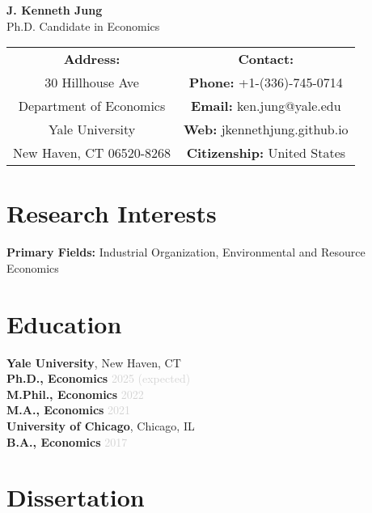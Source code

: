 \documentclass[11pt,letterpaper]{article}
\newcommand{\jobtitle}[1]{\textbf{\color{mediumgray}#1}}
\newcommand{\daterange}[1]{\textcolor{lightgray}{#1}}
\newenvironment{cvheader}
{\begin{center}\Large}
{\end{center}}
\begin{document}
\begin{cvheader}
{\Huge\textbf{\color{darkblue}J. Kenneth Jung}}\\[8pt]
{\large\textcolor{mediumgray}{Ph.D. Candidate in Economics}}
\end{cvheader}

\vspace{12pt}

\begin{center}
\begin{tabular}{c c}
\textbf{Address:} & \textbf{Contact:} \\
30 Hillhouse Ave & \textbf{Phone:} +1-(336)-745-0714 \\
Department of Economics & \textbf{Email:} ken.jung@yale.edu \\
Yale University & \textbf{Web:} jkennethjung.github.io \\
New Haven, CT 06520-8268 & \textbf{Citizenship:} United States \\
\end{tabular}
\end{center}

\vspace{8pt}

\section*{Research Interests}
\textbf{Primary Fields:} Industrial Organization, Environmental and Resource Economics

\section*{Education}

\textbf{Yale University}, New Haven, CT \\
\jobtitle{Ph.D., Economics} \hfill \daterange{2025 (expected)} \\
\jobtitle{M.Phil., Economics} \hfill \daterange{2022} \\
\jobtitle{M.A., Economics} \hfill \daterange{2021} \\

\textbf{University of Chicago}, Chicago, IL \\
\jobtitle{B.A., Economics} \hfill \daterange{2017}

\section*{Dissertation}
\end{document}
